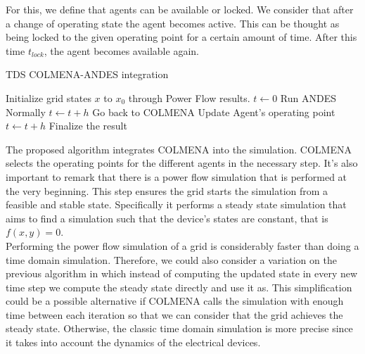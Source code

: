 \documentclass{report}
\begin{document}
For this, we define that agents can be available or locked. We consider that after a change of operating state the agent becomes active. This can be thought as being locked to the given operating point for a certain amount of time. After this time $t_{lock}$, the agent becomes available again.\\  

\begin{algorithm}
    \caption{TDS COLMENA-ANDES integration}
    \begin{algorithmic}[1]
    \State Initialize grid states $x$ to $x_0$ through Power Flow results.
    \State $t \gets 0$
            \State Run ANDES Normally
            \State $t \gets t + h$
        \EndWhile
        \State Go back to COLMENA
            \State Update Agent's operating point
        \EndFor
        \State $t \gets t + h$
    \EndWhile
    \State Finalize the result
    \end{algorithmic}
    \label{algo:COLMENAANDES}
\end{algorithm}

The proposed algorithm integrates COLMENA into the simulation. COLMENA selects the operating points for the different agents in the necessary step. It's also important to remark that there is a power flow simulation that is performed at the very beginning. This step ensures the grid starts the simulation from a feasible and stable state. Specifically it performs a steady state simulation that aims to find a simulation such that the device's states are constant, that is $f(x,y) = 0$.\\         

Performing the power flow simulation of a grid is considerably faster than doing a time domain simulation. Therefore, we could also consider a variation on the previous algorithm in which instead of computing the updated state in every new time step we compute the steady state directly and use it as. This simplification could be a possible alternative if COLMENA calls the simulation with enough time between each iteration so that we can consider that the grid achieves the steady state. Otherwise, the classic time domain simulation is more precise since it takes into account the dynamics of the electrical devices. \\

\printbibliography
\end{document}
